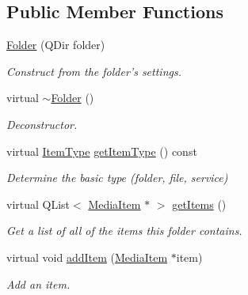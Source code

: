 \subsection*{Public Member Functions}
\begin{DoxyCompactItemize}
\item 
\hyperlink{class_a_w_e_1_1_folder_aee5d9308a9e516eb913e419c24248810}{Folder} (Q\-Dir folder)
\begin{DoxyCompactList}\small\item\em Construct from the folder's settings. \end{DoxyCompactList}\item 
\hypertarget{class_a_w_e_1_1_folder_a7b9eaf0f340d5275809494685b0a3e1d}{virtual \hyperlink{class_a_w_e_1_1_folder_a7b9eaf0f340d5275809494685b0a3e1d}{$\sim$\-Folder} ()}\label{class_a_w_e_1_1_folder_a7b9eaf0f340d5275809494685b0a3e1d}

\begin{DoxyCompactList}\small\item\em Deconstructor. \end{DoxyCompactList}\item 
virtual \hyperlink{namespace_a_w_e_ad175a5b8a86bf7848825c9bd94c41470}{Item\-Type} \hyperlink{class_a_w_e_1_1_folder_a315c0a52f6e37b357d5f0e4fc5526d52}{get\-Item\-Type} () const 
\begin{DoxyCompactList}\small\item\em Determine the basic type (folder, file, service) \end{DoxyCompactList}\item 
virtual Q\-List$<$ \hyperlink{class_a_w_e_1_1_media_item}{Media\-Item} $\ast$ $>$ \hyperlink{class_a_w_e_1_1_folder_ae5e4053b40082661ad5debf17cbe64ca}{get\-Items} ()
\begin{DoxyCompactList}\small\item\em Get a list of all of the items this folder contains. \end{DoxyCompactList}\item 
virtual void \hyperlink{class_a_w_e_1_1_folder_adb8c48413775f2a23a8107596d617a9d}{add\-Item} (\hyperlink{class_a_w_e_1_1_media_item}{Media\-Item} $\ast$item)
\begin{DoxyCompactList}\small\item\em Add an item. \end{DoxyCompactList}\end{DoxyCompactItemize}
